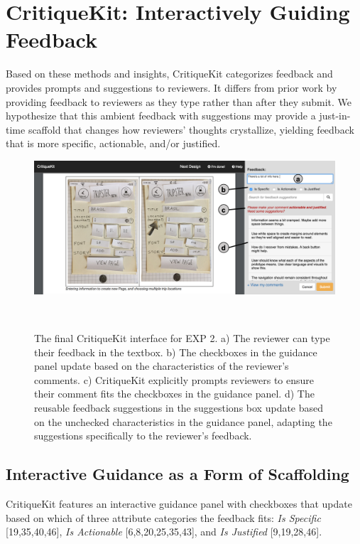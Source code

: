 \section{CritiqueKit: Interactively Guiding Feedback}
Based on these methods and insights, CritiqueKit categorizes feedback and provides prompts and suggestions to reviewers. It differs from prior work by providing feedback to reviewers as they type rather than after they submit. We hypothesize that this ambient feedback with suggestions may provide a just-in-time scaffold that changes how reviewers' thoughts crystallize, yielding feedback that is more specific, actionable, and/or justified. 

\begin{figure}
\centering
  \includegraphics[width=\textwidth]{critiquekit/figures/interface.png}
  \caption{The final CritiqueKit interface for EXP 2. a) The reviewer can type their feedback in the textbox. b) The checkboxes in the guidance panel update based on the characteristics of the reviewer’s comments. c) CritiqueKit explicitly prompts reviewers to ensure their comment fits the checkboxes in the guidance panel. d) The reusable feedback suggestions in the suggestions box update based on the unchecked characteristics in the guidance panel, adapting the suggestions specifically to the reviewer's feedback.}~\label{fig:critiquekit_interface}
\end{figure}

\subsection{Interactive Guidance as a Form of Scaffolding}
CritiqueKit features an interactive guidance panel with checkboxes that update based on which of three attribute categories the feedback fits: \textit{Is Specific} [19,35,40,46], \textit{Is Actionable} [6,8,20,25,35,43], and \textit{Is Justified} [9,19,28,46]. 

